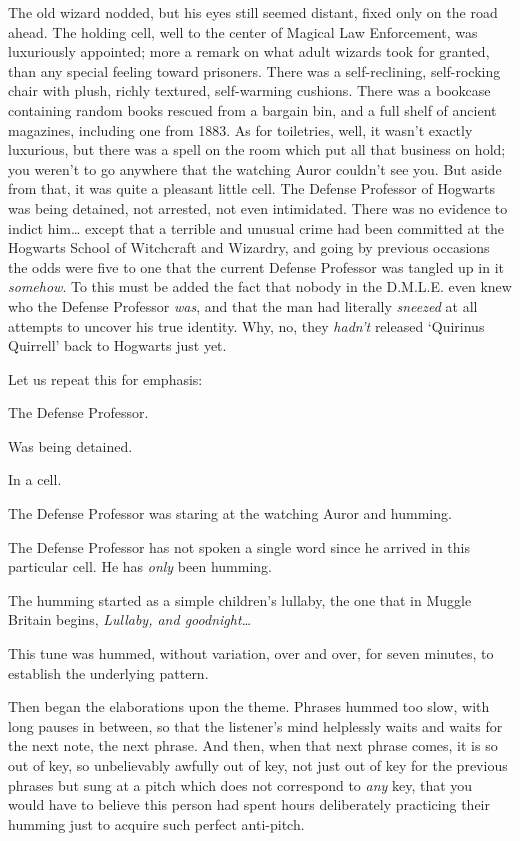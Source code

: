 The old wizard nodded, but his eyes still seemed distant, fixed only on the
road ahead.
\sbreak
The holding cell, well to the center of Magical Law Enforcement, was
luxuriously appointed; more a remark on what adult wizards took for granted,
than any special feeling toward prisoners. There was a self-reclining,
self-rocking chair with plush, richly textured, self-warming cushions. There
was a bookcase containing random books rescued from a bargain bin, and a full
shelf of ancient magazines, including one from 1883. As for toiletries, well,
it wasn't exactly luxurious, but there was a spell on the room which put all
that business on hold; you weren't to go anywhere that the watching Auror
couldn't see you. But aside from that, it was quite a pleasant little cell. The
Defense Professor of Hogwarts was being detained, not arrested, not even
intimidated. There was no evidence to indict him{\ldots} except that a terrible
and unusual crime had been committed at the Hogwarts School of Witchcraft and
Wizardry, and going by previous occasions the odds were five to one that the
current Defense Professor was tangled up in it \emph{somehow}. To this must be
added the fact that nobody in the D.M.L.E. even knew who the Defense Professor
\emph{was}, and that the man had literally \emph{sneezed} at all attempts to
uncover his true identity. Why, no, they \emph{hadn't} released `Quirinus
Quirrell' back to Hogwarts just yet.

Let us repeat this for emphasis:

The Defense Professor.

Was being detained.

In a cell.

The Defense Professor was staring at the watching Auror and humming.

The Defense Professor has not spoken a single word since he arrived in this
particular cell. He has \emph{only} been humming.

The humming started as a simple children's lullaby, the one that in Muggle
Britain begins, \emph{Lullaby, and goodnight{\ldots}}

This tune was hummed, without variation, over and over, for seven minutes, to
establish the underlying pattern.

Then began the elaborations upon the theme. Phrases hummed too slow, with long
pauses in between, so that the listener's mind helplessly waits and waits for
the next note, the next phrase. And then, when that next phrase comes, it is so
out of key, so unbelievably awfully out of key, not just out of key for the
previous phrases but sung at a pitch which does not correspond to \emph{any}
key, that you would have to believe this person had spent hours deliberately
practicing their humming just to acquire such perfect anti-pitch.

